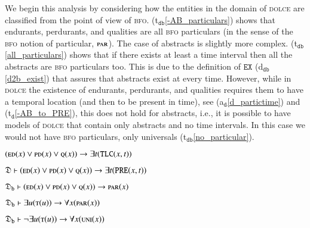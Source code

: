 \documentclass[ao]{iosart2x}
\newcommand{\bflist}{\begin{list}{}{\setlength{\topsep}{2mm}\setlength{\parsep}{0mm}\setlength{\leftmargin}{9.2mm}\setlength{\labelwidth}{8mm}}}
\newcommand{\eflist}{\end{list}}
\newcommand{\dolceAxLabel}{\textrm{a$_\texttt{d}$}}
\newcommand{\dolceThrLabel}{\textrm{t$_\texttt{d}$}}
\newcommand{\dbDefLabel}{\textrm{d$_\texttt{db}$}}
\newcommand{\dbThrLabel}{\textrm{t$_\texttt{db}$}}
\newcounter{cntax}
\newcommand{\dolceax}[1]{\refstepcounter{cntax}\begin{small}{\bf \dolceAxLabel\thecntax\label{#1}}\end{small}}
\newcounter{cntthr}
\newcommand{\dolceth}[1]{\refstepcounter{cntthr}\begin{small}{\bf \dolceThrLabel\thecntthr\label{#1}}\end{small}}
\newcounter{cntdbth}
\newcommand{\dbth}[1]{\refstepcounter{cntdbth}\begin{small}{\bf \dbThrLabel\thecntdbth\label{#1}}\end{small}}
\newcommand{\refdolceax}[1]{({\dolceAxLabel}\ref{#1})}
\newcommand{\refdolceth}[1]{({\dolceThrLabel}\ref{#1})}
\newcommand{\refdbdf}[1]{({\dbDefLabel}\ref{#1})}
\newcommand{\refdbth}[1]{({\dbThrLabel}\ref{#1})}
\newcommand{\pr}[1]{\mathtt{#1}}
\newcommand{\dolce}{{\textsc{dolce}}}
\newcommand{\bfo}{{\textsc{bfo}}}
\newcommand {\thdolce} {\ensuremath{\mathfrak{D}}}
\newcommand {\thdolcedbmap} {\ensuremath{\mathfrak{D}_\texttt{b}}}
\newcommand {\EDdcat} {\textsc{ed}}
\newcommand {\PDdcat} {\textsc{pd}}
\newcommand {\Qdcat} {\textsc{q}}
\newcommand {\Tdcat} {\textsc{t}}
\newcommand {\PREd} {\ensuremath{\pr{PRE}}}
\newcommand {\TLCd} {\ensuremath{\pr{TLC}}}
\newcommand{\bfopartic}{\textsc{par}}
\newcommand{\bfouniv}{\textsc{uni}}
\newcommand{\bfoexist}{\pr{EX}}
\begin{document}
We begin this analysis by considering how the entities in the domain of {\dolce} are classified from the point of view of {\bfo}. \refdbth{-AB_particulars} shows that endurants, perdurants, and qualities are all {\bfo} particulars (in the sense of the {\bfo} notion of particular, $\bfopartic$). The case of abstracts is slightly more complex. \refdbth{all_particulars} shows that if there exists at least a time interval then all the abstracts are {\bfo} particulars too. This is due to the definition of $\bfoexist$ \refdbdf{d2b_exist} that assures that abstracts exist at every time. However, while in  {\dolce} the existence of endurants, perdurants, and qualities requires them to have a temporal location (and then to be present in time), see \refdolceax{d_partictime} and \refdolceth{-AB_to_PRE}, this does not hold for abstracts, i.e., it is possible to have models of {\dolce} that contain only abstracts and no time intervals. In this case we would not have {\bfo} particulars, only universals \refdbth{no_particular}.

\bflist
\item[\dolceax{d_partictime}] $(\EDdcat(x) \lor \PDdcat(x) \lor \Qdcat(x)) \to \exists t(\TLCd(x,t))$ 

\item[\dolceth{-AB_to_PRE}] $\thdolce \vdash (\EDdcat(x) \lor \PDdcat(x) \lor \Qdcat(x)) \to \exists t(\PREd(x,t))$

\item[\dbth{-AB_particulars}] $\thdolcedbmap \vdash (\EDdcat(x) \lor \PDdcat(x) \lor \Qdcat(x)) \to \bfopartic(x)$

\item[\dbth{all_particulars}] $\thdolcedbmap \vdash \exists u(\Tdcat(u)) \to \forall x(\bfopartic(x))$

\item[\dbth{no_particular}] $\thdolcedbmap \vdash \neg\exists u(\Tdcat(u)) \to \forall x(\bfouniv(x))$

\eflist
\end{document}
